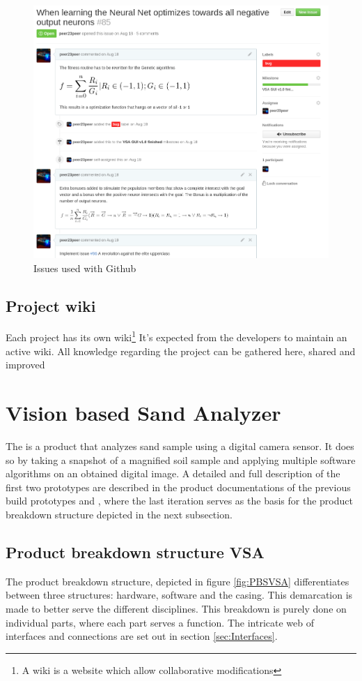 \documentclass[fleqn,10pt]{SelfArx} %
\begin{document}
\begin{figure}[ht]
	\includegraphics[width=\textwidth/2]{../images/issue.png}
	\caption{Issues used with Github}\label{fig:issue}
\end{figure}

\subsection{Project wiki}
Each project has its own wiki\footnote{A wiki is a website which allow collaborative modifications} It's expected from the developers to maintain an active wiki. All knowledge regarding the project can be gathered here, shared and improved

\section{Vision based Sand Analyzer}\label{sec:Vision based Sand Analyzer}
The \vsa is a product that analyzes sand sample using a digital camera sensor. It does so by taking a snapshot of a magnified soil sample and applying multiple software algorithms on an obtained digital image. A detailed and full description of the first two prototypes are described in the product documentations of the previous build prototypes \cite{jelle_spijker_vision_2015} and \cite{spijker_product_2014}, where the last iteration serves as the basis for the product breakdown structure depicted in the next subsection.

\subsection{Product breakdown structure VSA}
The product breakdown structure, depicted in figure \ref{fig:PBSVSA} differentiates between three structures: hardware, software and the casing. This demarcation is made to better serve the different disciplines. This breakdown is purely done on individual parts, where each part serves a function. The intricate web of interfaces and connections are set out in section \ref{sec:Interfaces}.
\end{document}
